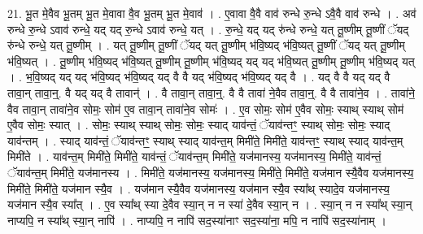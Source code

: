 \documentclass[17pt]{extarticle}
\begin{document}
21. भू॒त मे॒वैव भू॒तम् भू॒त मे॒वावा वै॒व भू॒तम् भू॒त मे॒वाव॑ । . ए॒वावा वै॒वै वाव॑ रुन्धे रु॒न्धे ऽवै॒वै वाव॑ रुन्धे । . अव॑ रुन्धे रु॒न्धे ऽवाव॑ रुन्धे॒ यद् यद् रु॒न्धे ऽवाव॑ रुन्धे॒ यत् । . रु॒न्धे॒ यद् यद् रु॑न्धे रुन्धे॒ यत् तू॒ष्णीम् तू॒ष्णीं ॅयद् रु॑न्धे रुन्धे॒ यत् तू॒ष्णीम् । . यत् तू॒ष्णीम् तू॒ष्णीं ॅयद् यत् तू॒ष्णीम् भ॑वि॒ष्यद् भ॑वि॒ष्यत् तू॒ष्णीं ॅयद् यत् तू॒ष्णीम् भ॑वि॒ष्यत् । . तू॒ष्णीम् भ॑वि॒ष्यद् भ॑वि॒ष्यत् तू॒ष्णीम् तू॒ष्णीम् भ॑वि॒ष्यद् यद् यद् भ॑वि॒ष्यत् तू॒ष्णीम् तू॒ष्णीम् भ॑वि॒ष्यद् यत् । . भ॒वि॒ष्यद् यद् यद् भ॑वि॒ष्यद् भ॑वि॒ष्यद् यद् वै वै यद् भ॑वि॒ष्यद् भ॑वि॒ष्यद् यद् वै । . यद् वै वै यद् यद् वै तावा॒न् तावा॒न्॒. वै यद् यद् वै तावान्॑ । . वै तावा॒न् तावा॒न्॒. वै वै तावा॑ ने॒वैव तावा॒न्॒. वै वै तावा॑ने॒व । . तावा॑ने॒ वैव तावा॒न् तावा॑ने॒व सोमः॒ सोम॑ ए॒व तावा॒न् तावा॑ने॒व सोमः॑ । . ए॒व सोमः॒ सोम॑ ए॒वैव सोमः॒ स्याथ् स्याथ् सोम॑ ए॒वैव सोमः॒ स्यात् । . सोमः॒ स्याथ् स्याथ् सोमः॒ सोमः॒ स्याद् याव॑न्तं॒ ॅयाव॑न्तꣳ॒॒ स्याथ् सोमः॒ सोमः॒ स्याद् याव॑न्तम् । . स्याद् याव॑न्तं॒ ॅयाव॑न्तꣳ॒॒ स्याथ् स्याद् याव॑न्त॒म् मिमी॑ते॒ मिमी॑ते॒ याव॑न्तꣳ॒॒ स्याथ् स्याद् याव॑न्त॒म् मिमी॑ते । . याव॑न्त॒म् मिमी॑ते॒ मिमी॑ते॒ याव॑न्तं॒ ॅयाव॑न्त॒म् मिमी॑ते॒ यज॑मानस्य॒ यज॑मानस्य॒ मिमी॑ते॒ याव॑न्तं॒ ॅयाव॑न्त॒म् मिमी॑ते॒ यज॑मानस्य । . मिमी॑ते॒ यज॑मानस्य॒ यज॑मानस्य॒ मिमी॑ते॒ मिमी॑ते॒ यज॑मान स्यै॒वैव यज॑मानस्य॒ मिमी॑ते॒ मिमी॑ते॒ यज॑मान स्यै॒व । . यज॑मान स्यै॒वैव यज॑मानस्य॒ यज॑मान स्यै॒व स्या᳚थ् स्यादे॒व यज॑मानस्य॒ यज॑मान स्यै॒व स्या᳚त् । . ए॒व स्या᳚थ् स्या दे॒वैव स्या॒न् न न स्या॑ दे॒वैव स्या॒न् न । . स्या॒न् न न स्या᳚थ् स्या॒न् नाप्यपि॒ न स्या᳚थ् स्या॒न् नापि॑ । . नाप्यपि॒ न नापि॑ सद॒स्या॑नाꣳ सद॒स्या॑ना॒ मपि॒ न नापि॑ सद॒स्या॑नाम् । \newline
\end{document}
